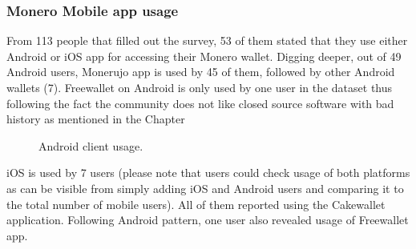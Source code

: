 \documentclass[
  printed, %
  table,   %
  nolof,     %
  nolot,     %
           oneside, color
]{fithesis3}
\begin{document}
\subsubsection{Monero Mobile app usage}
From 113 people that filled out the survey, 53 of them stated that they use either Android or iOS app for accessing their Monero wallet. Digging deeper, out of 49 Android users, Monerujo app is used by 45 of them, followed by other Android wallets (7). Freewallet on Android is only used by one user in the dataset thus following the fact the community does not like closed source software with bad history as mentioned in the Chapter %
\begin{center}
\begin{figure}[H]
\caption{Android client usage.}
\label{chart:price}\end{figure}\end{center}

iOS is used by 7 users (please note that users could check usage of both platforms as can be visible from simply adding iOS and Android users and comparing it to the total number of mobile users). All of them reported using the Cakewallet application. Following Android pattern, one user also revealed usage of Freewallet app.
\end{document}
